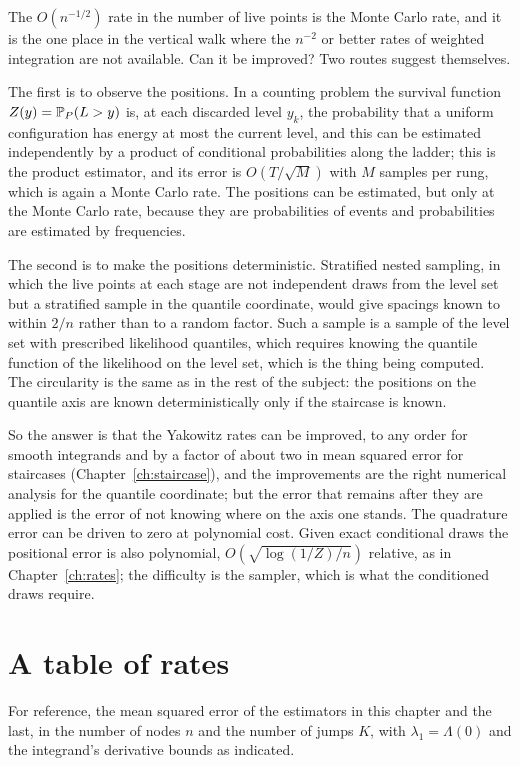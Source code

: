 The $O(n^{-1/2})$ rate in the number of live points is the Monte Carlo rate, and it is the one place in the vertical walk where the $n^{-2}$ or better rates of weighted integration are not available. Can it be improved? Two routes suggest themselves.

The first is to observe the positions. In a counting problem the survival function $Z(y) = \mathbb{P}_P(L > y)$ is, at each discarded level $y_k$, the probability that a uniform configuration has energy at most the current level, and this can be estimated independently by a product of conditional probabilities along the ladder; this is the product estimator, and its error is $O(T / \sqrt{M})$ with $M$ samples per rung, which is again a Monte Carlo rate. The positions can be estimated, but only at the Monte Carlo rate, because they are probabilities of events and probabilities are estimated by frequencies.

The second is to make the positions deterministic. Stratified nested sampling, in which the live points at each stage are not independent draws from the level set but a stratified sample in the quantile coordinate, would give spacings known to within $2/n$ rather than to a random factor. Such a sample is a sample of the level set with prescribed likelihood quantiles, which requires knowing the quantile function of the likelihood on the level set, which is the thing being computed. The circularity is the same as in the rest of the subject: the positions on the quantile axis are known deterministically only if the staircase is known.

So the answer is that the Yakowitz rates can be improved, to any order for smooth integrands and by a factor of about two in mean squared error for staircases (Chapter~\ref{ch:staircase}), and the improvements are the right numerical analysis for the quantile coordinate; but the error that remains after they are applied is the error of not knowing where on the axis one stands. The quadrature error can be driven to zero at polynomial cost. Given exact conditional draws the positional error is also polynomial, $O(\sqrt{\log(1/Z)/n})$ relative, as in Chapter~\ref{ch:rates}; the difficulty is the sampler, which is what the conditioned draws require.

\section{A table of rates}

For reference, the mean squared error of the estimators in this chapter and the last, in the number of nodes $n$ and the number of jumps $K$, with $\lambda_1 = \Lambda(0)$ and the integrand's derivative bounds as indicated.

